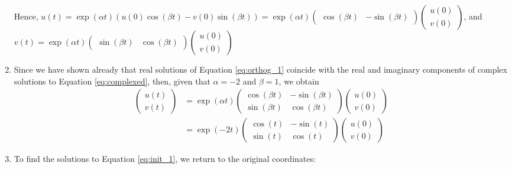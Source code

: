 \documentclass[12pt,letterpaper]{article}
\begin{document}
\begin{enumerate}[label=(\alph*)]
	      Hence, $u(t) = \exp(\alpha t)(u(0)\cos(\beta t) - v(0)\sin(\beta t)) = \exp(\alpha t)\begin{pmatrix}
			      \cos(\beta t) & -\sin(\beta t)
		      \end{pmatrix} \begin{pmatrix}
			      u(0) \\
			      v(0)
		      \end{pmatrix}$, and $v(t) = \exp(\alpha t) \begin{pmatrix}
			      \sin(\beta t) & \cos(\beta t)
		      \end{pmatrix} \begin{pmatrix}
			      u(0) \\
			      v(0)
		      \end{pmatrix}$
	\item Since we have shown already that real solutions of Equation \ref{eq:orthog_1} coincide with the real and imaginary components of complex solutions to Equation \ref{eq:complexed}, then, given that $\alpha = -2$ and $\beta = 1$, we obtain
	      \begin{align}
		      \begin{pmatrix}
			      u(t) \\
			      v(t)
		      \end{pmatrix} & =
		      \exp(\alpha t)\begin{pmatrix}
			      \cos(\beta t) & -\sin(\beta t) \\
			      \sin(\beta t) & \cos(\beta t)
		      \end{pmatrix}  \begin{pmatrix}
			      u(0) \\
			      v(0)
		      \end{pmatrix} \\
		                                 & =
		      \exp(-2 t)\begin{pmatrix}
			      \cos(t) & -\sin(t) \\
			      \sin(t) & \cos(t)
		      \end{pmatrix}  \begin{pmatrix}
			      u(0) \\
			      v(0)
		      \end{pmatrix}
	      \end{align}
	\item To find the solutions to Equation \ref{eq:init_1}, we return to the original coordinates:


\end{enumerate}
\end{document}
